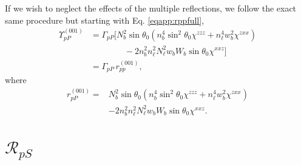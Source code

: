 If we wish to neglect the effects of the multiple reflections, we follow the
exact same procedure but starting with Eq. \eqref{eqapp:rppfull},
\begin{equation*}
\begin{split}
\Upsilon^{(001)}_{pP} &=
\Gamma_{pP}
\big[
N^{2}_{b}\sin\theta_{0}(n^{4}_{b}\sin^{2}\theta_{0}\chi^{zzz}
+ n^{4}_{\ell}w^{2}_{b}\chi^{zxx})\\
&\qquad\qquad- 2n^{2}_{b}n^{2}_{\ell}N^{2}_{\ell}w_{b}W_{b}\sin\theta_{0}
\chi^{xxz}
\big]\\
&= \Gamma_{pP}\,r^{(001)}_{pp},
\end{split}
\end{equation*}
where
\begin{equation}\label{eqapp:final-rpp.001}
\begin{split}
r^{(001)}_{pP} = 
&N^{2}_{b}\sin\theta_{0}(n^{4}_{b}\sin^{2}\theta_{0}\chi^{zzz}
+ n^{4}_{\ell}w^{2}_{b}\chi^{zxx})\\
&- 2n^{2}_{b}n^{2}_{\ell}N^{2}_{\ell}w_{b}W_{b}\sin\theta_{0}\chi^{xxz}.
\end{split}
\end{equation}




\section{\texorpdfstring{$\mathcal{R}_{pS}$}{RpS}}

